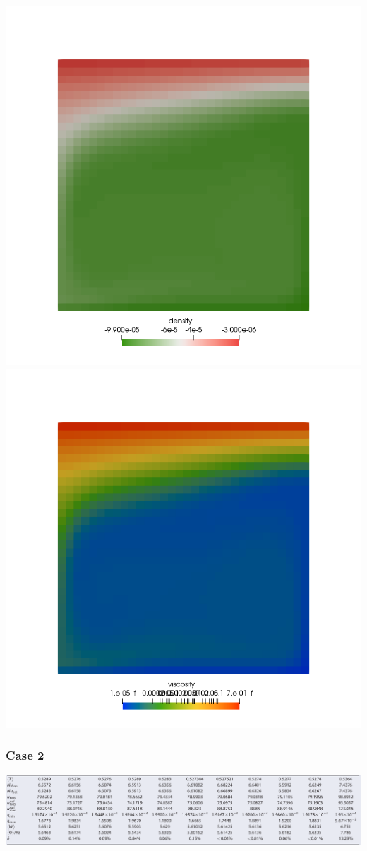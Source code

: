 \begin{center}
\includegraphics[width=7.cm]{python_codes/fieldstone_28/results_case1/rho}
\includegraphics[width=7.cm]{python_codes/fieldstone_28/results_case1/mueff}
\end{center}









\newpage %
\subsubsection*{Case 2}

\includegraphics[width=16cm]{python_codes/fieldstone_28/results_case4/tosn15}

